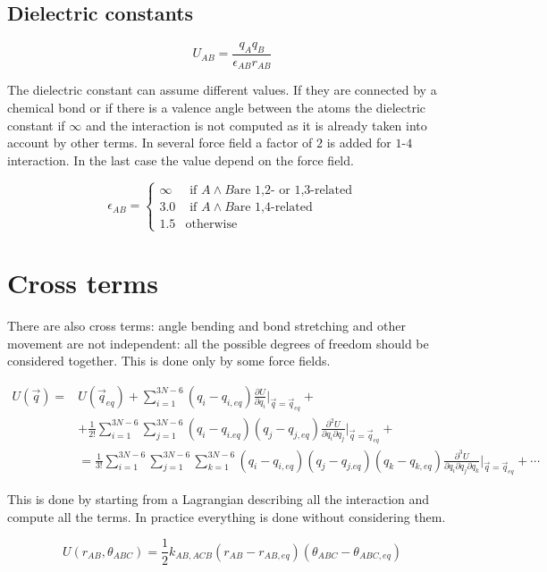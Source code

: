 	\subsection{Dielectric constants}

	$$U_{AB} = \frac{q_Aq_B}{\epsilon_{AB}r_{AB}}$$

	The dielectric constant can assume different values.
	If they are connected by a chemical bond or if there is a valence angle between the atoms the dielectric constant if $\infty$ and the interaction is not computed as it is already taken into account by other terms.
	In several force field a factor of $2$ is added for $1$-$4$ interaction.
	In the last case the value depend on the force field.

	$$\epsilon_{AB} = \begin{cases}\infty&\text{ if }A\land B\text{are 1,2- or 1,3-related}\\3.0&\text{ if }A\land B\text{are 1,4-related}\\1.5&\text{otherwise}\end{cases}$$

\section{Cross terms}
There are also cross terms: angle bending and bond stretching and other movement are not independent: all the possible degrees of freedom should be considered together.
This is done only by some force fields.

\begin{align*}
	U(\vec{q}) = &U(\vec{q}_{eq}) + \sum\limits_{i=1}^{3N-6}(q_i-q_{i,eq})\frac{\partial U}{\partial q_i}|_{\vec{q}=\vec{q}_{eq}} + \\
							 &+\frac{1}{2!}\sum\limits_{i=1}^{3N-6}\sum\limits_{j=1}^{3N-6}(q_i-q_{i.eq})(q_j-q_{j,eq})\frac{\partial^2 U}{\partial q_i\partial q_j}|_{\vec{q}=\vec{q}_{eq}} +\\
							 &=\frac{1}{3!}\sum\limits_{i=1}^{3N-6}\sum\limits_{j=1}^{3N-6}\sum\limits_{k=1}^{3N-6}(q_i-q_{i,eq})(q_j-q_{j.eq})(q_k-q_{k,eq})\frac{\partial^3 U}{\partial q_i\partial q_j\partial q_k}|_{\vec{q}=\vec{q}_{eq}} + \cdots
\end{align*}

This is done by starting from a Lagrangian describing all the interaction and compute all the terms.
In practice everything is done without considering them.

$$U(r_{AB}, \theta_{ABC}) = \frac{1}{2}k_{AB,ACB}(r_{AB}-r_{AB, eq})(\theta_{ABC}-\theta_{ABC, eq})$$

